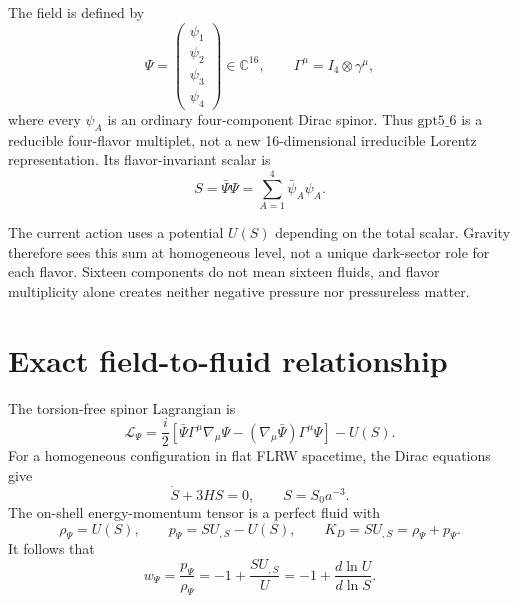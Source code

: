 \documentclass[11pt]{article}
\newcommand{\gptfield}{\ensuremath{\mathrm{gpt5\_6}}}
\begin{document}
The field is defined by
\begin{equation}
  \Psi=\begin{pmatrix}\psi_1\\ \psi_2\\ \psi_3\\ \psi_4\end{pmatrix}
  \in\mathbb C^{16},
  \qquad
  \Gamma^\mu=I_4\otimes\gamma^\mu,
  \label{eq:multiplet}
\end{equation}
where every $\psi_A$ is an ordinary four-component Dirac spinor.  Thus
\gptfield{} is a reducible four-flavor multiplet, not a new 16-dimensional
irreducible Lorentz representation.  Its flavor-invariant scalar is
\begin{equation}
  S=\bar\Psi\Psi=\sum_{A=1}^{4}\bar\psi_A\psi_A.
  \label{eq:bilinear}
\end{equation}

The current action uses a potential $U(S)$ depending on the total scalar.
Gravity therefore sees this sum at homogeneous level, not a unique dark-sector
role for each flavor.  Sixteen components do not mean sixteen fluids, and
flavor multiplicity alone creates neither negative pressure nor pressureless
matter.

\section{Exact field-to-fluid relationship}

The torsion-free spinor Lagrangian is
\begin{equation}
\mathcal L_\Psi=
\frac{i}{2}\left[
\bar\Psi\Gamma^\mu\nabla_\mu\Psi
-(\nabla_\mu\bar\Psi)\Gamma^\mu\Psi
\right]-U(S).
\label{eq:lagrangian}
\end{equation}
For a homogeneous configuration in flat FLRW spacetime, the Dirac equations
give
\begin{equation}
  \dot S+3HS=0,
  \qquad S=S_0a^{-3}.
  \label{eq:dilution}
\end{equation}
The on-shell energy-momentum tensor is a perfect fluid with
\begin{equation}
  \rho_\Psi=U(S),
  \qquad
  p_\Psi=SU_{,S}-U(S),
  \qquad
  K_D=SU_{,S}=\rho_\Psi+p_\Psi.
  \label{eq:thermodynamics}
\end{equation}
It follows that
\begin{equation}
  w_\Psi=\frac{p_\Psi}{\rho_\Psi}
  =-1+\frac{SU_{,S}}{U}
  =-1+\frac{d\ln U}{d\ln S}.
  \label{eq:slope}
\end{equation}
\end{document}
